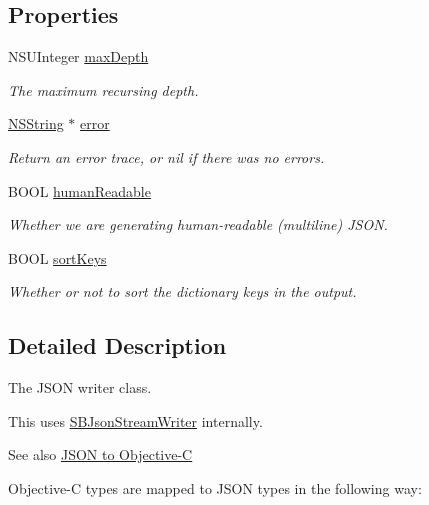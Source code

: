 \subsection*{\-Properties}
\begin{DoxyCompactItemize}
\item 
\-N\-S\-U\-Integer \hyperlink{interface_s_b_json_writer_a283b4f65ab4d3e1a8112b37dea432689}{max\-Depth}
\begin{DoxyCompactList}\small\item\em \-The maximum recursing depth. \end{DoxyCompactList}\item 
\hyperlink{class_n_s_string}{\-N\-S\-String} $\ast$ \hyperlink{interface_s_b_json_writer_a9915988454e0ea4111cb05831133b625}{error}
\begin{DoxyCompactList}\small\item\em \-Return an error trace, or nil if there was no errors. \end{DoxyCompactList}\item 
\-B\-O\-O\-L \hyperlink{interface_s_b_json_writer_a16ca84860a2ee76a03b567dc5181a851}{human\-Readable}
\begin{DoxyCompactList}\small\item\em \-Whether we are generating human-\/readable (multiline) \-J\-S\-O\-N. \end{DoxyCompactList}\item 
\-B\-O\-O\-L \hyperlink{interface_s_b_json_writer_af25807a58a322b56cb5d3593532228e5}{sort\-Keys}
\begin{DoxyCompactList}\small\item\em \-Whether or not to sort the dictionary keys in the output. \end{DoxyCompactList}\end{DoxyCompactItemize}


\subsection{\-Detailed \-Description}
\-The \-J\-S\-O\-N writer class. 

\-This uses \hyperlink{interface_s_b_json_stream_writer}{\-S\-B\-Json\-Stream\-Writer} internally.

\begin{DoxySeeAlso}{\-See also}
\hyperlink{json2objc}{\-J\-S\-O\-N to \-Objective-\/\-C}
\end{DoxySeeAlso}
\-Objective-\/\-C types are mapped to \-J\-S\-O\-N types in the following way\-:


